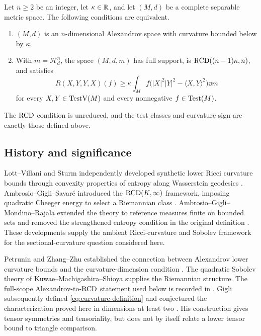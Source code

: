 \begin{theorem}
\label{main:equivalence}
Let \(n\ge2\) be an integer, let \(\kappa\in\mathbb R\), and let \((M,d)\)
be a complete separable metric space. The following conditions are
equivalent.
\begin{enumerate}[label=\textup{(\Alph*)}]
\item \((M,d)\) is an \(n\)-dimensional Alexandrov space with curvature
bounded below by \(\kappa\).
\item With \(m=\mathcal H^n_d\), the space \((M,d,m)\) has full support,
is \(\mathrm{RCD}((n-1)\kappa,n)\), and satisfies
\begin{equation}
\label{eq:main-curvature}
R(X,Y,Y,X)(f)\ge
\kappa\int_M f\bigl(|X|^2|Y|^2-\langle X,Y\rangle^2\bigr)\dd m
\end{equation}
for every \(X,Y\in\operatorname{TestV}(M)\) and every nonnegative \(f\in\operatorname{Test}(M)\).
\end{enumerate}
The \(\mathrm{RCD}\) condition is unreduced, and the test classes and
curvature sign are exactly those defined above.
\end{theorem}

\subsection{History and significance}

Lott--Villani and Sturm independently developed synthetic lower
Ricci curvature bounds through convexity properties of entropy along
Wasserstein geodesics \cite{LottVillani2009,Sturm2006I,Sturm2006II}.
Ambrosio--Gigli--Savar\'e introduced the \(\mathrm{RCD}(K,\infty)\)
framework, imposing quadratic Cheeger energy to select a Riemannian
class \cite{AGS2014}. Ambrosio--Gigli--Mondino--Rajala extended
the theory to reference measures finite on bounded sets and removed
the strengthened entropy condition in the original definition
\cite{AGMR2015}. These developments supply the ambient Ricci-curvature
and Sobolev framework for the sectional-curvature question considered here.

Petrunin and Zhang--Zhu established the connection between
Alexandrov lower curvature bounds and the curvature-dimension condition
\cite{Petrunin2011,ZhangZhu2010}.
The quadratic Sobolev theory of Kuwae--Machigashira--Shioya
\cite{KMS2001} supplies the Riemannian structure.
The full-scope Alexandrov-to-\(\mathrm{RCD}\) statement used below is recorded
in \cite[Theorem~2.9 and Corollary~2.10]{KapovitchKettererSturm}.
Gigli subsequently defined
\eqref{eq:curvature-definition} and conjectured the
characterization proved here in dimensions at least two
\cite[Conjecture~1.1]{Gigli2019}.
His construction gives tensor symmetries and tensoriality, but does
not by itself relate a lower tensor bound to triangle comparison.

